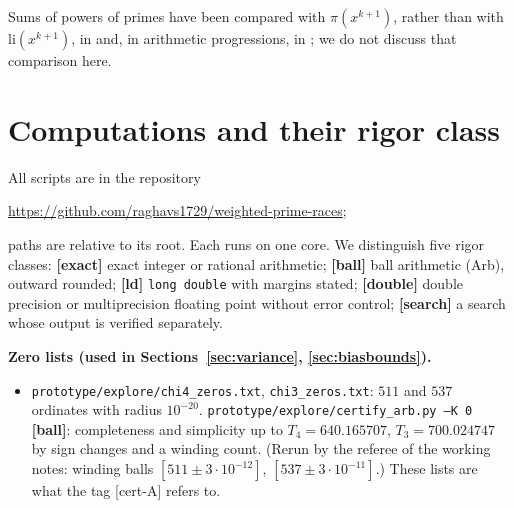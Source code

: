 \documentclass[11pt]{amsart}
\theoremstyle{definition}
\numberwithin{equation}{section}
\newcommand{\certA}{\textsf{[cert-A]}}
\begin{document}
Sums of powers of primes have been compared with $\pi(x^{k+1})$,
rather than with $\mathrm{li}(x^{k+1})$, in \cite{GW18,Was24} and, in
arithmetic progressions, in \cite{BBLMR24}; we do not discuss that
comparison here.

\section{Computations and their rigor class}\label{sec:comp}

All scripts are in the repository
\begin{center}
\url{https://github.com/raghavs1729/weighted-prime-races};
\end{center}
paths are relative to its root. Each runs on one core. We distinguish five
rigor classes: \textbf{[exact]} exact integer or rational arithmetic;
\textbf{[ball]} ball arithmetic (Arb), outward rounded;
\textbf{[ld]} \texttt{long double} with margins stated;
\textbf{[double]} double precision or multiprecision floating point
without error control; \textbf{[search]} a search whose output is
verified separately.

\medskip\noindent\textbf{Zero lists (used in
Sections~\ref{sec:variance}, \ref{sec:biasbounds}).}
\begin{itemize}
\item \texttt{prototype/explore/chi4\_zeros.txt},
\texttt{chi3\_zeros.txt}: $511$ and $537$ ordinates with radius
$10^{-20}$. \texttt{prototype/explore/certify\_arb.py --K 0}
\textbf{[ball]}: completeness and simplicity up to
$T_4=640.165707$, $T_3=700.024747$ by sign changes and a winding
count. (Rerun by the referee of the working notes: winding balls
$[511\pm3\cdot10^{-12}]$, $[537\pm3\cdot10^{-11}]$.) These lists are
what the tag \certA{} refers to.
\end{itemize}
\end{document}
